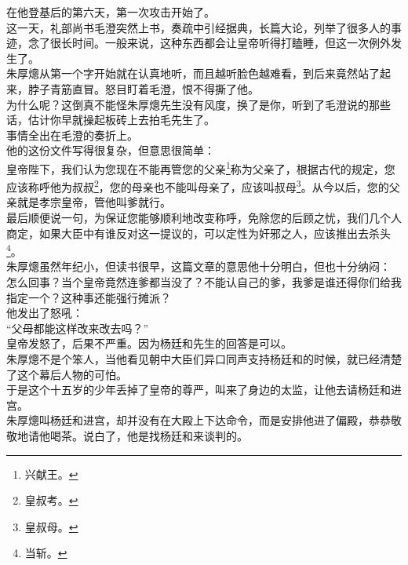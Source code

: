 \begin{multicols}{\theparacolNo}
在他登基后的第六天，第一次攻击开始了。\\

这一天，礼部尚书毛澄突然上书，奏疏中引经据典，长篇大论，列举了很多人的事迹，念了很长时间。一般来说，这种东西都会让皇帝听得打瞌睡，但这一次例外发生了。\\

朱厚熜从第一个字开始就在认真地听，而且越听脸色越难看，到后来竟然站了起来，脖子青筋直冒。怒目盯着毛澄，恨不得撕了他。\\

为什么呢？这倒真不能怪朱厚熜先生没有风度，换了是你，听到了毛澄说的那些话，估计你早就操起板砖上去拍毛先生了。\\

事情全出在毛澄的奏折上。\\

他的这份文件写得很复杂，但意思很简单：\\

皇帝陛下，我们认为您现在不能再管您的父亲\footnote{兴献王。}称为父亲了，根据古代的规定，您应该称呼他为叔叔\footnote{皇叔考。}，您的母亲也不能叫母亲了，应该叫叔母\footnote{皇叔母。}。从今以后，您的父亲就是孝宗皇帝，管他叫爹就行。\\

最后顺便说一句，为保证您能够顺利地改变称呼，免除您的后顾之忧，我们几个人商定，如果大臣中有谁反对这一提议的，可以定性为奸邪之人，应该推出去杀头\footnote{当斩。}。\\

朱厚熜虽然年纪小，但读书很早，这篇文章的意思他十分明白，但也十分纳闷：\\

怎么回事？当个皇帝竟然连爹都当没了？不能认自己的爹，我爹是谁还得你们给我指定一个？这种事还能强行摊派？\\

他发出了怒吼：\\

“父母都能这样改来改去吗？”\\

皇帝发怒了，后果不严重。因为杨廷和先生的回答是可以。\\

朱厚熜不是个笨人，当他看见朝中大臣们异口同声支持杨廷和的时候，就已经清楚了这个幕后人物的可怕。\\

于是这个十五岁的少年丢掉了皇帝的尊严，叫来了身边的太监，让他去请杨廷和进宫。\\

朱厚熜叫杨廷和进宫，却并没有在大殿上下达命令，而是安排他进了偏殿，恭恭敬敬地请他喝茶。说白了，他是找杨廷和来谈判的。\\


\end{multicols}

